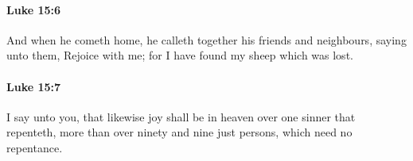 		\paragraph{Luke 15:6} %
			\label{LUKE-15-6}

			And when he cometh home, he calleth together his friends and neighbours, saying unto them, Rejoice with me; for I have found my sheep which was lost.

			\begin{framed}
			\scriptsize
				\begin{compactdesc}
					\item[SBLG] 
				\end{compactdesc}
			\end{framed}

		\paragraph{Luke 15:7} %
			\label{LUKE-15-7}

			I say unto you, that likewise joy shall be in heaven over one sinner that repenteth, more than over ninety and nine just persons, which need no repentance.

